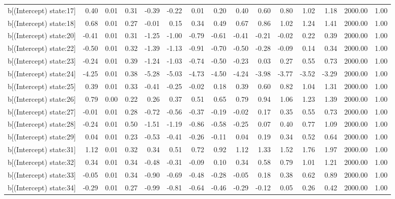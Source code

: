 \begin{table}[ht]
\begin{tabular}{rrrrrrrrrrrrrrr}
  b[(Intercept) state:17] & 0.40 & 0.01 & 0.31 & -0.39 & -0.22 & 0.01 & 0.20 & 0.40 & 0.60 & 0.80 & 1.02 & 1.18 & 2000.00 & 1.00 \\ 
  b[(Intercept) state:18] & 0.68 & 0.01 & 0.27 & -0.01 & 0.15 & 0.34 & 0.49 & 0.67 & 0.86 & 1.02 & 1.24 & 1.41 & 2000.00 & 1.00 \\ 
  b[(Intercept) state:20] & -0.41 & 0.01 & 0.31 & -1.25 & -1.00 & -0.79 & -0.61 & -0.41 & -0.21 & -0.02 & 0.22 & 0.39 & 2000.00 & 1.00 \\ 
  b[(Intercept) state:22] & -0.50 & 0.01 & 0.32 & -1.39 & -1.13 & -0.91 & -0.70 & -0.50 & -0.28 & -0.09 & 0.14 & 0.34 & 2000.00 & 1.00 \\ 
  b[(Intercept) state:23] & -0.24 & 0.01 & 0.39 & -1.24 & -1.03 & -0.74 & -0.50 & -0.23 & 0.03 & 0.27 & 0.55 & 0.73 & 2000.00 & 1.00 \\ 
  b[(Intercept) state:24] & -4.25 & 0.01 & 0.38 & -5.28 & -5.03 & -4.73 & -4.50 & -4.24 & -3.98 & -3.77 & -3.52 & -3.29 & 2000.00 & 1.00 \\ 
  b[(Intercept) state:25] & 0.39 & 0.01 & 0.33 & -0.41 & -0.25 & -0.02 & 0.18 & 0.39 & 0.60 & 0.82 & 1.04 & 1.31 & 2000.00 & 1.00 \\ 
  b[(Intercept) state:26] & 0.79 & 0.00 & 0.22 & 0.26 & 0.37 & 0.51 & 0.65 & 0.79 & 0.94 & 1.06 & 1.23 & 1.39 & 2000.00 & 1.00 \\ 
  b[(Intercept) state:27] & -0.01 & 0.01 & 0.28 & -0.72 & -0.56 & -0.37 & -0.19 & -0.02 & 0.17 & 0.35 & 0.55 & 0.73 & 2000.00 & 1.00 \\ 
  b[(Intercept) state:28] & -0.24 & 0.01 & 0.50 & -1.51 & -1.19 & -0.86 & -0.58 & -0.25 & 0.07 & 0.40 & 0.77 & 1.09 & 2000.00 & 1.00 \\ 
  b[(Intercept) state:29] & 0.04 & 0.01 & 0.23 & -0.53 & -0.41 & -0.26 & -0.11 & 0.04 & 0.19 & 0.34 & 0.52 & 0.64 & 2000.00 & 1.00 \\ 
  b[(Intercept) state:31] & 1.12 & 0.01 & 0.32 & 0.34 & 0.51 & 0.72 & 0.92 & 1.12 & 1.33 & 1.52 & 1.76 & 1.97 & 2000.00 & 1.00 \\ 
  b[(Intercept) state:32] & 0.34 & 0.01 & 0.34 & -0.48 & -0.31 & -0.09 & 0.10 & 0.34 & 0.58 & 0.79 & 1.01 & 1.21 & 2000.00 & 1.00 \\ 
  b[(Intercept) state:33] & -0.05 & 0.01 & 0.34 & -0.90 & -0.69 & -0.48 & -0.28 & -0.05 & 0.18 & 0.38 & 0.62 & 0.89 & 2000.00 & 1.00 \\ 
  b[(Intercept) state:34] & -0.29 & 0.01 & 0.27 & -0.99 & -0.81 & -0.64 & -0.46 & -0.29 & -0.12 & 0.05 & 0.26 & 0.42 & 2000.00 & 1.00 \\ 

\end{tabular}
\end{table}
